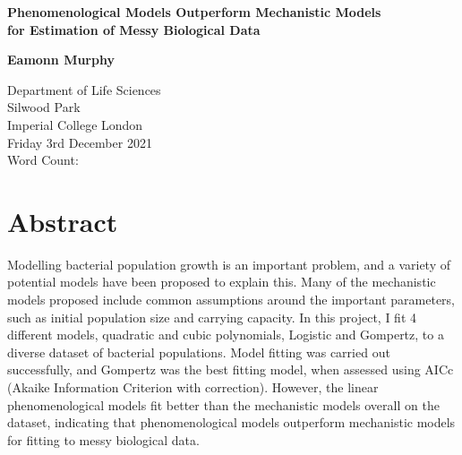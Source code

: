 \documentclass[11pt,a4wide,titlepage]{article}
\newcommand{\quickwordcount}[1]{
		
}
\begin{document}
\begin{titlepage}
	\begin{center}
		\vspace*{1cm}
		
		\begin{Large}
			\textbf{Phenomenological Models Outperform Mechanistic Models\\
				for Estimation of Messy Biological Data}
		\end{Large}
		
		
		\vspace{1.5cm}
		
		\textbf{Eamonn Murphy}
		
		\vfill
		
		Department of Life Sciences\\
		Silwood Park\\
		Imperial College London\\
		\vspace{\baselineskip}
		Friday 3rd December 2021\\
		\vspace{\baselineskip}
		Word Count: \quickwordcount{main}
		\vfill
		
	\end{center}
\end{titlepage}

\section*{Abstract}
Modelling bacterial population growth is an important problem, and a variety of potential models have been proposed to explain this. Many of the mechanistic models proposed include common assumptions around the important parameters, such as initial population size and carrying capacity. In this project, I fit 4 different models, quadratic and cubic polynomials, Logistic and Gompertz, to a diverse dataset of bacterial populations. Model fitting was carried out successfully, and Gompertz was the best fitting model, when assessed using AICc (Akaike Information Criterion with correction). However, the linear phenomenological models fit better than the mechanistic models overall on the dataset, indicating that phenomenological models outperform mechanistic models for fitting to messy biological data.
\end{document}
